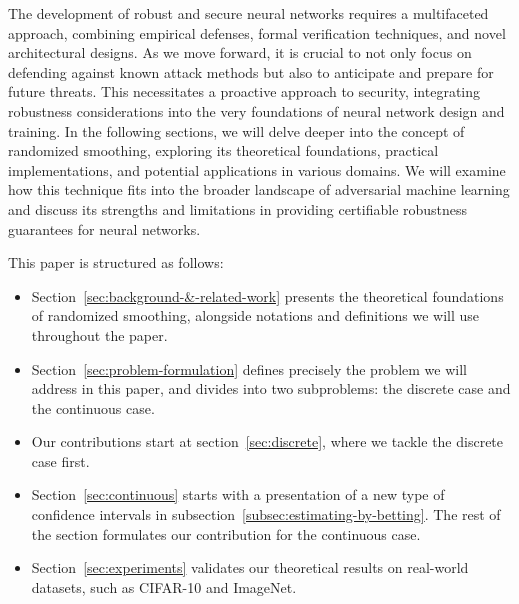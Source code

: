 The development of robust and secure neural networks requires a multifaceted approach, combining empirical defenses, formal verification techniques, and novel architectural designs.
As we move forward, it is crucial to not only focus on defending against known attack methods but also to anticipate and prepare for future threats.
This necessitates a proactive approach to security, integrating robustness considerations into the very foundations of neural network design and training.
In the following sections, we will delve deeper into the concept of randomized smoothing, exploring its theoretical foundations, practical implementations, and potential applications in various domains.
We will examine how this technique fits into the broader landscape of adversarial machine learning and discuss its strengths and limitations in providing certifiable robustness guarantees for neural networks.

This paper is structured as follows:
\begin{itemize}
    \item Section~\ref{sec:background-&-related-work} presents the theoretical foundations of randomized smoothing, alongside notations and definitions we will use throughout the paper.
    \item Section~\ref{sec:problem-formulation} defines precisely the problem we will address in this paper, and divides into two subproblems: the discrete case and the continuous case.
    \item Our contributions start at section~\ref{sec:discrete}, where we tackle the discrete case first.
    \item Section~\ref{sec:continuous} starts with a presentation of a new type of confidence intervals in subsection~\ref{subsec:estimating-by-betting}. The rest of the section formulates our contribution for the continuous case.
    \item Section~\ref{sec:experiments} validates our theoretical results on real-world datasets, such as CIFAR-10 and ImageNet.
\end{itemize}